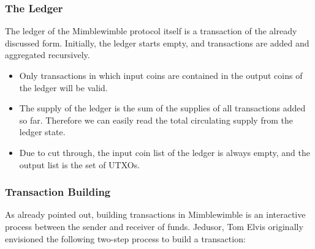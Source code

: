 \subsubsection{The Ledger \label{sec:pre:mimblewimble:ledger}}
The ledger of the Mimblewimble protocol itself is a transaction of the already discussed form. Initially, the ledger starts empty, and transactions are added and aggregated recursively.
\begin{itemize}
    \item Only transactions in which input coins are contained in the output coins of the ledger will be valid.
    \item The supply of the ledger is the sum of the supplies of all transactions added so far. Therefore we can easily read the total circulating supply from the ledger state.
    \item Due to cut through, the input coin list of the ledger is always empty, and the output list is the set of UTXOs.
\end{itemize}

\subsubsection{Transaction Building \label{sec:pre:mimblewimble:txbuild}}
As already pointed out, building transactions in Mimblewimble is an interactive process between the sender and receiver of funds. Jedusor, Tom Elvis originally envisioned the following two-step process
to build a transaction:~\cite{jedusor2016mimblewimble}

